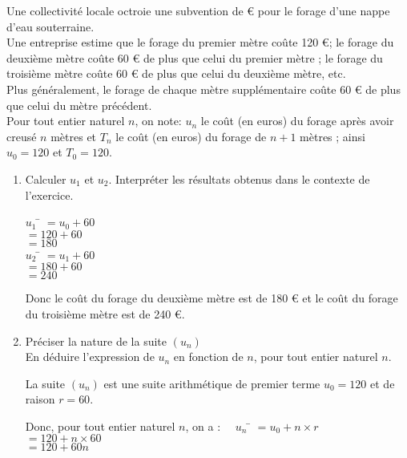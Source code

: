 \documentclass[a4paper,11pt,exos]{nsi}
\begin{document}
\exo{}
Une collectivité locale octroie une subvention de  € pour le forage d'une nappe d'eau souterraine. \\
Une entreprise estime que le forage du premier mètre coûte 120 €; le forage du deuxième mètre coûte 60 € de plus que celui du premier mètre ; le forage du troisième mètre coûte 60 € de plus que celui du deuxième mètre, etc.\\
Plus généralement, le forage de chaque mètre supplémentaire coûte 60 € de plus que celui du mètre précédent.\\[.5em]    
Pour tout entier naturel $n$, on note: $u_n$ le coût (en euros) du forage après avoir creusé $n$ mètres et $T_n$ le coût (en euros) du forage de $n+1$ mètres ; ainsi $u_0=120$ et $T_0=120$.
    
\begin{enumerate}
    \item Calculer $u_1$ et $u_2$. Interpréter les résultats obtenus dans le contexte de l'exercice.
    \textcolor{UGLiBlue}{
        \begin{multicols}{2}
            \begin{tabbing}
                $u_1$ \= $=u_0+60$\\ 
                \>  $=120 + 60$\\
                \> $= 180$\\[.5em]
                $u_2$ \= $= u_1 + 60$\\
                \> $= 180 + 60$\\
                \> $= 240$
            \end{tabbing}
        \end{multicols}
        Donc le coût du forage du deuxième mètre est de 180 € et le coût du forage du troisième mètre est de 240 €.
    }
    \item Préciser la nature de la suite $\left(u_n\right)$\\
    En déduire l'expression de $u_n$ en fonction de $n$, pour tout entier naturel $n$.\\[.5em]
    \textcolor{UGLiBlue}{
        La suite $(u_n)$ est une suite arithmétique de premier terme $u_0 = 120$ et de raison $r = 60$.
        \begin{tabbing}
            Donc, pour tout entier naturel $n$, on a : $\quad u_n$ \= $= u_0 + n \times r$\\
            \> $= 120 + n \times 60$\\
            \> $= 120 + 60n$
        \end{tabbing}
}
\end{enumerate}
\end{document}
